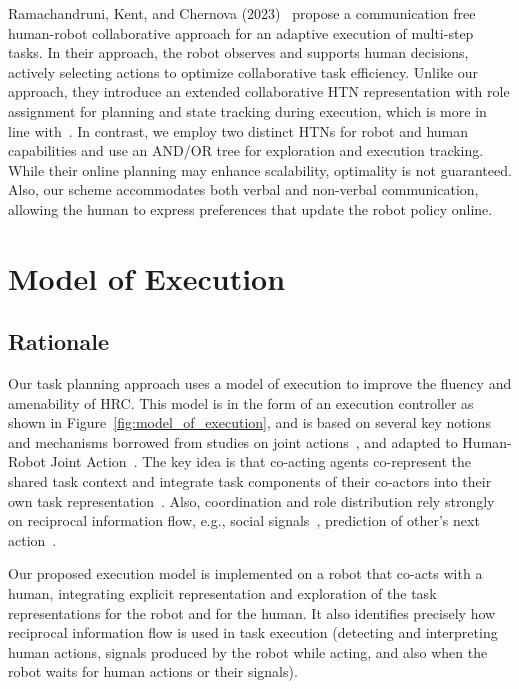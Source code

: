 Ramachandruni, Kent, and Chernova (2023)~\cite{RAMACHANDRUNI2023} propose a communication free human-robot collaborative approach for an adaptive execution of multi-step tasks. 
In their approach, the robot observes and supports human decisions, actively selecting actions to optimize collaborative task efficiency. 
Unlike our approach, they introduce an extended collaborative HTN representation with role assignment for planning and state tracking during execution, which is more in line with~\cite{roncone2017transparent}. 
In contrast, we employ two distinct HTNs for robot and human capabilities and use an AND/OR tree for exploration and execution tracking. While their online planning may enhance scalability, optimality is not guaranteed. 
Also, our scheme accommodates both verbal and non-verbal communication, allowing the human to express preferences that update the robot policy online. 



\section{Model of Execution}

    \subsection{Rationale}



Our task planning approach uses a model of execution to improve the fluency and amenability of HRC. 
This model is in the form of an execution controller as shown in Figure~\ref{fig:model_of_execution}, and is based on several key notions and mechanisms borrowed from studies on joint actions~\cite{Sebanz-2016,kourtis2014attention}, and adapted to Human-Robot Joint Action~\cite{clodic-2017,curioni-2019}.
The key idea is that co-acting agents co-represent the shared task context and integrate task components of their co-actors into their own task representation~\cite{Schmitz-2017, Yamaguchi-19}. Also, coordination and role distribution rely strongly on reciprocal information flow, e.g., social signals~\cite{curioni-2019}, prediction of other's next action~\cite{luke-2018}.

Our proposed execution model is implemented on a robot that co-acts with a human, integrating explicit representation and exploration of the task representations for the robot and for the human. 
It also identifies precisely how reciprocal information flow is used in task execution (detecting and interpreting human actions, signals produced by the robot while acting, and also when the robot waits for human actions or their signals).

